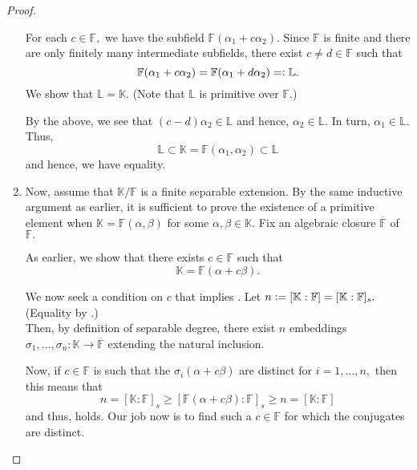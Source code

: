 \begin{proof}
\begin{enumerate}[leftmargin=*]
        For each $c \in \mathbb{F},$ we have the subfield $\mathbb{F}(\alpha_1 + c\alpha_2).$ Since $\mathbb{F}$ is finite and there are only finitely many intermediate subfields, there exist $c \neq d \in \mathbb{F}$ such that 
        \begin{equation*} 
            \mathbb{F}(\alpha_1 + c\alpha_2) = \mathbb{F}(\alpha_1 + d\alpha_2) =\vcentcolon \mathbb{L}.
        \end{equation*} 
        We show that $\mathbb{L} = \mathbb{K}.$ (Note that $\mathbb{L}$ is primitive over $\mathbb{F}.$)

        By the above, we see that $(c - d)\alpha_2 \in \mathbb{L}$ and hence, $\alpha_2 \in \mathbb{L}.$ In turn, $\alpha_1 \in \mathbb{L}.$ Thus,
        \begin{equation*} 
            \mathbb{L} \subset \mathbb{K} = \mathbb{F}(\alpha_1, \alpha_2) \subset \mathbb{L}
        \end{equation*}
        and hence, we have equality.
        \item Now, assume that $\mathbb{K}/\mathbb{F}$ is a finite separable extension. By the same inductive argument as earlier, it is sufficient to prove the existence of a primitive element when $\mathbb{K} = \mathbb{F}(\alpha, \beta)$ for some $\alpha, \beta \in \mathbb{K}.$ Fix an algebraic closure $\overline{\mathbb{F}}$ of $\mathbb{F}.$

        As earlier, we show that there exists $c \in \mathbb{F}$ such that
        \begin{equation} \label{eq:003} \tag{$*$}
            \mathbb{K} = \mathbb{F}(\alpha + c\beta).
        \end{equation}

        We now seek a condition on $c$ that implies . Let $n \vcentcolon= [\mathbb{K} : \mathbb{F}] = [\mathbb{K} : \mathbb{F}]_s.$ (Equality by .) \\
        Then, by definition of separable degree, there exist $n$ embeddings $\sigma_1, \ldots, \sigma_n : \mathbb{K} \to \overline{\mathbb{F}}$ extending the natural inclusion. 

        Now, if $c \in \mathbb{F}$ is such that the  $\sigma_i(\alpha + c\beta)$ are distinct for $i = 1, \ldots, n,$ then this means that 
        \begin{equation*} 
            n = [\mathbb{K} : \mathbb{F}]_s \ge [\mathbb{F}(\alpha + c\beta) : \mathbb{F}]_s \ge n = [\mathbb{K} : \mathbb{F}]
        \end{equation*}
        and thus,  holds. Our job now is to find such a $c \in \mathbb{F}$ for which the conjugates are distinct. 


\end{enumerate}
\end{proof}
